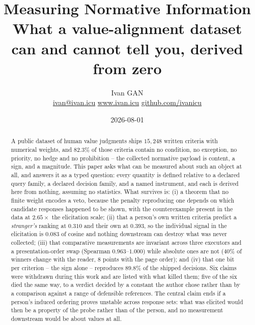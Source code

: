 

\title{\sffamily\bfseries Measuring Normative Information\\[0.35em]
  {\large\mdseries What a value-alignment dataset can and cannot tell you, derived from zero}}
\author{\sffamily Ivan GAN\\[3pt]
\small\mdseries
\href{mailto:ivan@ivan.icu}{ivan@ivan.icu}
\quad
\href{https://www.ivan.icu}{www.ivan.icu}
\quad
\href{https://github.com/ivanicu}{github.com/ivanicu}}
\date{2026-08-01}


\maketitle

\begin{abstract}
\noindent
A public dataset of human value judgments ships $15{,}248$ written criteria with
numerical weights, and $82.3\%$ of those criteria contain no condition, no
exception, no priority, no hedge and no prohibition -- the collected normative
payload is content, a sign, and a magnitude. This paper asks what can be measured
about such an object at all, and answers it as a typed question: every quantity
is defined relative to a declared query family, a declared decision family, and a
named instrument, and each is derived here from nothing, assuming no statistics.
What survives is: (i) a theorem that no finite weight encodes a veto, because the
penalty reproducing one depends on which candidate responses happened to be
shown, with the counterexample present in the data at $2.65\times$ the elicitation
scale; (ii) that a person's own written criteria predict a \emph{stranger's}
ranking at $0.310$ and their own at $0.393$, so the individual signal in the
elicitation is $0.083$ of cosine and nothing downstream can destroy what was never
collected; (iii) that comparative measurements are invariant across three
executors and a presentation-order swap (Spearman $0.963$--$1.000$) while absolute
ones are not ($40\%$ of winners change with the reader, $8$ points with the page
order); and (iv) that one bit per criterion -- the sign alone -- reproduces
$89.8\%$ of the shipped decisions. Six claims were withdrawn during this work and
are listed with what killed them; five of the six died the same way, to a verdict
decided by a constant the author chose rather than by a comparison against a range
of defensible references. The central claim ends if a person's induced ordering
proves unstable across response sets: what was elicited would then be a property
of the probe rather than of the person, and no measurement downstream would be
about values at all.
\end{abstract}

